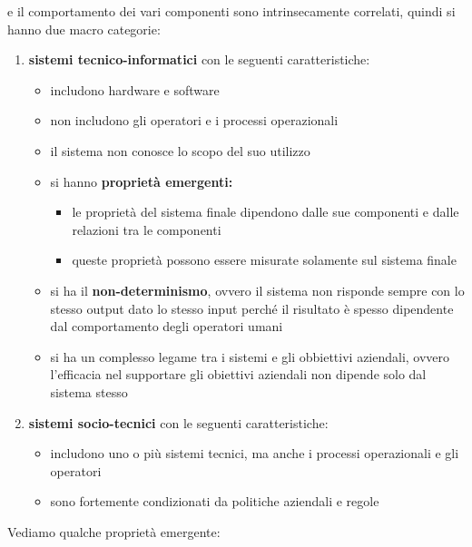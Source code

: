 \documentclass[a4paper,12pt, oneside]{book}
\begin{document}
e il comportamento dei vari componenti sono intrinsecamente correlati, quindi si hanno due macro categorie:
\begin{enumerate}
    \item \textbf{sistemi tecnico-informatici} con le seguenti caratteristiche:
    \begin{itemize}
        \item includono hardware e software
        \item non includono gli operatori e i processi operazionali
        \item il sistema non conosce lo scopo del suo utilizzo
        \item si hanno \textbf{proprietà emergenti:}
        \begin{itemize}
            \item le proprietà del sistema finale dipendono dalle sue componenti e dalle relazioni tra le componenti
            \item queste proprietà possono essere misurate solamente sul sistema finale
        \end{itemize}
        \item si ha il \textbf{non-determinismo}, ovvero il sistema non risponde sempre con lo stesso output dato lo
              stesso input perché il risultato è spesso dipendente dal comportamento degli operatori umani
        \item si ha un complesso legame tra i sistemi e gli obbiettivi aziendali, ovvero l'efficacia nel supportare
                gli obiettivi aziendali non dipende solo dal sistema stesso
    \end{itemize}
    \item \textbf{sistemi socio-tecnici} con le seguenti caratteristiche:
    \begin{itemize}
        \item includono uno o più sistemi tecnici, ma anche i processi operazionali e gli operatori
        \item sono fortemente condizionati da politiche aziendali e regole
\end{itemize}
\end{enumerate}
\newpage
Vediamo qualche proprietà emergente:
\end{document}
